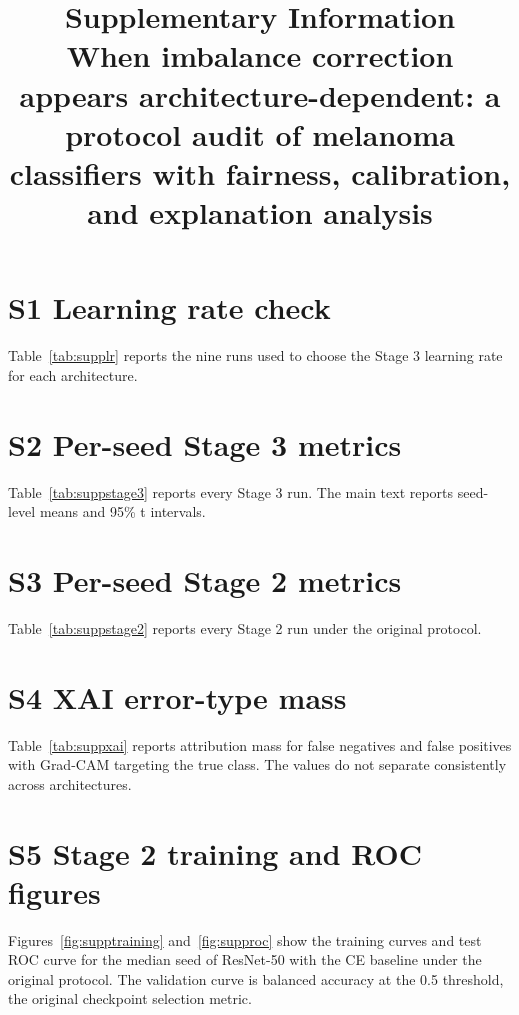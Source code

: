 \documentclass[11pt]{article}
\title{Supplementary Information\\[0.3em]
\large When imbalance correction appears architecture-dependent: a protocol audit of melanoma classifiers with fairness, calibration, and explanation analysis}
\author{}
\date{}
\begin{document}
\maketitle

\section*{S1 Learning rate check}

Table~\ref{tab:supplr} reports the nine runs used to choose the Stage 3 learning rate for each architecture.



\section*{S2 Per-seed Stage 3 metrics}

Table~\ref{tab:suppstage3} reports every Stage 3 run. The main text reports seed-level means and 95\% t intervals.



\section*{S3 Per-seed Stage 2 metrics}

Table~\ref{tab:suppstage2} reports every Stage 2 run under the original protocol.



\section*{S4 XAI error-type mass}

Table~\ref{tab:suppxai} reports attribution mass for false negatives and false positives with Grad-CAM targeting the true class. The values do not separate consistently across architectures.



\section*{S5 Stage 2 training and ROC figures}

Figures~\ref{fig:supptraining} and~\ref{fig:supproc} show the training curves and test ROC curve for the median seed of ResNet-50 with the CE baseline under the original protocol. The validation curve is balanced accuracy at the 0.5 threshold, the original checkpoint selection metric.
\end{document}
